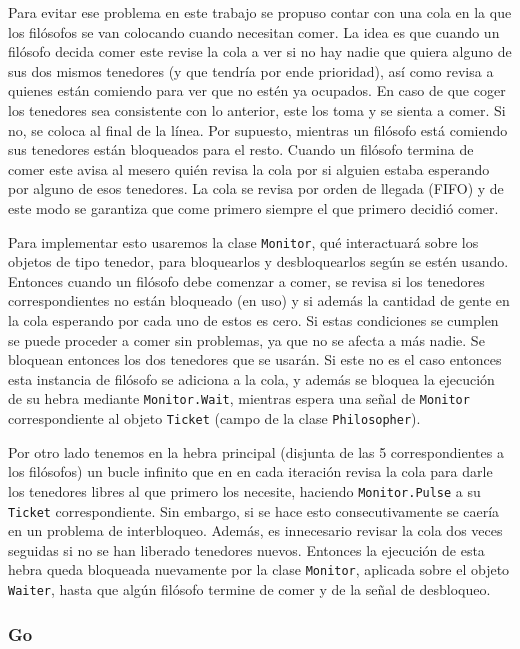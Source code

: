 \documentclass[10pt]{article} %
\newcommand{\csl}[1]{\colorbox{backcolour}{\texttt{#1}}}
\begin{document}
Para evitar ese problema en este trabajo se propuso contar con una cola en la que los fil\'osofos se van colocando cuando necesitan comer. La idea es que cuando un fil\'osofo decida comer este revise la cola a ver si no hay nadie que quiera alguno de sus dos mismos tenedores (y que tendr\'ia por ende prioridad), as\'i como revisa a quienes est\'an comiendo para ver que no est\'en ya ocupados. En caso de que coger los tenedores sea consistente con lo anterior, este los toma y se sienta a comer. Si no, se coloca al final de la l\'inea. Por supuesto, mientras un fil\'osofo est\'a comiendo sus tenedores est\'an bloqueados para el resto. Cuando un fil\'osofo termina de comer este avisa al mesero qui\'en revisa la cola por si alguien estaba esperando por alguno de esos tenedores. La cola se revisa por orden de llegada (FIFO) y de este modo se garantiza que come primero siempre el que primero decidi\'o comer.\

Para implementar esto usaremos la clase \csl{Monitor}, qu\'e interactuar\'a sobre los objetos de tipo tenedor, para bloquearlos y desbloquearlos seg\'un se est\'en usando. Entonces cuando un fil\'osofo debe comenzar a comer, se revisa si los tenedores correspondientes no est\'an bloqueado (en uso) y si adem\'as la cantidad de gente en la cola esperando por cada uno de estos es cero. Si estas condiciones se cumplen se puede proceder a comer sin problemas, ya que no se afecta a m\'as nadie. Se bloquean entonces los dos tenedores que se usar\'an. Si este no es el caso entonces esta instancia de fil\'osofo se adiciona a la cola, y adem\'as se bloquea la ejecuci\'on de su hebra mediante \csl{Monitor.Wait}, mientras espera una se\~nal de \csl{Monitor} correspondiente al objeto \csl{Ticket} (campo de la clase \csl{Philosopher}).

Por otro lado tenemos en la hebra principal (disjunta de las 5 correspondientes a los fil\'osofos) un bucle infinito que en en cada iteraci\'on revisa la cola para darle los tenedores libres al que primero los necesite, haciendo \csl{Monitor.Pulse} a su \csl{Ticket} correspondiente. Sin embargo, si se hace esto consecutivamente se caer\'ia en un problema de interbloqueo. Adem\'as, es innecesario revisar la cola dos veces seguidas si no se han liberado tenedores nuevos. Entonces la ejecuci\'on de esta hebra queda bloqueada nuevamente por la clase \csl{Monitor}, aplicada sobre el objeto \csl{Waiter}, hasta que alg\'un fil\'osofo termine de comer y de la se\~nal de desbloqueo.

\subsubsection{Go}
\end{document}
